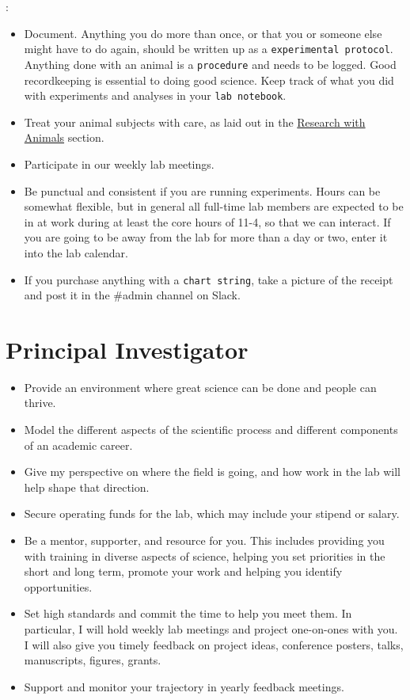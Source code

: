 \documentclass{tufte-book}
\newcommand{\doccls}[1]{\texttt{#1}}%
\begin{document}
:

\begin{itemize}
\item{Document. Anything you do more than once, or that you or someone
  else might have to do again, should be written up as a
  \doccls{experimental protocol}. Anything done with an animal is a
  \doccls{procedure} and needs to be logged. Good recordkeeping is
  essential to doing good science. Keep track of what you did with
  experiments and analyses in your \doccls{lab notebook}.}
\item{Treat your animal subjects with care, as laid out in the
  \href{ch:animals}{Research with Animals} section.}
\item{Participate in our weekly lab meetings.}
\item{Be punctual and consistent if you are running experiments. Hours
  can be somewhat flexible, but in general all full-time lab members
  are expected to be in at work during at least the core hours of
  11-4, so that we can interact. If you are going to be away from the
  lab for more than a day or two, enter it into the lab calendar.}
\item{If you purchase anything with a \doccls{chart string}, take a picture of the receipt
  and post it in the \#admin channel on Slack.}
\end{itemize}

\section{Principal Investigator}


\begin{itemize}
\item{Provide an environment where great science can be done and
  people can thrive.}
\item{Model the different aspects of the scientific process and
  different components of an academic career.}
\item{Give my perspective on
  where the field is going, and how work in the lab will help shape
  that direction.}
\item{Secure operating funds for the lab, which may include your
  stipend or salary.}
\item{Be a mentor, supporter, and resource for you. This includes
  providing you with training in diverse aspects of science, helping
  you set priorities in the short and long term, promote your work and
  helping you identify opportunities.}
\item{Set high standards and commit the time to help you meet them. In
  particular, I will hold weekly lab meetings and project one-on-ones
  with you. I will also give you timely feedback on project ideas,
  conference posters, talks, manuscripts, figures, grants.}
\item{Support and monitor your trajectory in yearly feedback
  meetings.}
\end{itemize}
\end{document}
